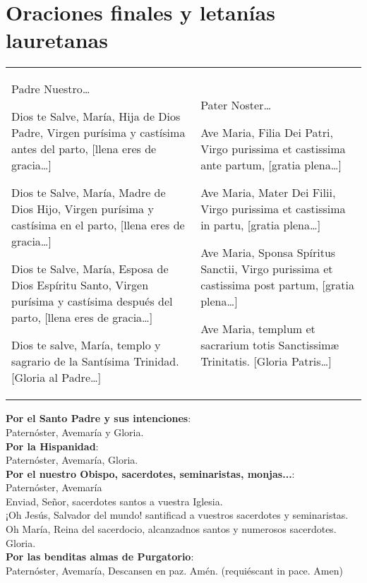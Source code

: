 \documentclass[./rosary.tex]{subfiles}
\begin{document}
\section*{Oraciones finales y letanías lauretanas}
\label{sec:final-prayer}

\begin{longtable} { p{} p{} }
    Padre Nuestro{\ldots}

    Dios te Salve, María, Hija de Dios Padre, Virgen purísima y castísima antes del parto, [llena eres de gracia{\ldots}]

    Dios te Salve, María, Madre de Dios Hijo, Virgen purísima y castísima en el parto, [llena eres de gracia{\ldots}]

    Dios te Salve, María, Esposa de Dios Espíritu Santo, Virgen purísima y castísima después del parto, [llena eres de gracia{\ldots}]

    Dios te salve, María, templo y sagrario de la Santísima Trinidad. [Gloria al Padre{\ldots}]

     &

    Pater Noster{\ldots}

    Ave Maria, Filia Dei Patri, Virgo purissima et castissima ante partum, [gratia plena{\ldots}]

    Ave Maria, Mater Dei Filii, Virgo purissima et castissima in partu, [gratia plena{\ldots}]

    Ave Maria, Sponsa Spíritus Sanctii, Virgo purissima et castissima post partum, [gratia plena{\ldots}]

    Ave Maria, templum et sacrarium totis Sanctissimæ Trinitatis. [Gloria Patris{\ldots}]
\end{longtable}

\noindent\textbf{Por el Santo Padre y sus intenciones}:\\
{\indent}Paternóster, Avemaría y Gloria.\\
\noindent\textbf{Por la Hispanidad}:\\ 
{\indent}Paternóster, Avemaría, Gloria.\\
\noindent\textbf{Por el nuestro Obispo, sacerdotes, seminaristas, monjas...}:\\ 
{\indent}Paternóster, Avemaría\\
{\indent}Enviad, Señor, sacerdotes santos a vuestra Iglesia.\\
{\indent}¡Oh Jesús, Salvador del mundo! santificad a vuestros sacerdotes y seminaristas.\\
{\indent}Oh María, Reina del sacerdocio, alcanzadnos santos y numerosos sacerdotes.\\
{\indent}Gloria.\\
\noindent\textbf{Por las benditas almas de Purgatorio}:\\
{\indent}Paternóster, Avemaría, Descansen en paz. Amén. (requiéscant in pace. Amen)
\end{document}
